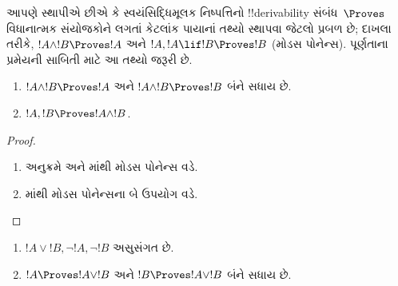 \documentclass[../../../include/open-logic-section]{subfiles}
\begin{document}
      {}
      {}


\begin{explain}
  આપણે સ્થાપીએ છીએ કે સ્વયંસિદ્ધિમૂલક નિષ્પત્તિનો !!{derivability}
  સંબંધ~$\Proves$ વિધાનાત્મક સંયોજકોને લગતાં કેટલાંક પાયાનાં તથ્યો
  સ્થાપવા જેટલો પ્રબળ છે; દાખલા તરીકે, $!A \land !B \Proves !A$ અને
  $!A, !A \lif !B \Proves !B$ (મોડસ પોનેન્સ). પૂર્ણતાના પ્રમેયની
  સાબિતી માટે આ તથ્યો જરૂરી છે.
\end{explain}

\begin{prop}
  \begin{enumerate}
  \item {} $!A \land !B \Proves !A$
    અને $!A \land !B \Proves !B$ બંને સધાય છે.
  \item {} $!A, !B \Proves !A \land !B$.
  \end{enumerate}
\end{prop}

\begin{proof}
  \begin{enumerate}
    \item અનુક્રમે  અને
      માંથી મોડસ પોનેન્સ વડે.
  \item {}માંથી મોડસ પોનેન્સના બે ઉપયોગ વડે.
  \end{enumerate}
\end{proof}



\begin{prop}
  \begin{enumerate}
  \item $!A \lor !B, \lnot !A, \lnot !B$ અસુસંગત છે.
  \item $!A \Proves !A \lor !B$ અને $!B \Proves !A \lor !B$ બંને સધાય છે.
  \end{enumerate}
\end{prop}
\end{document}
